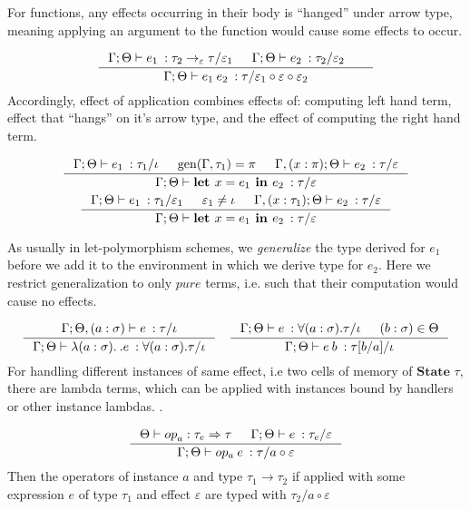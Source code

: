 \documentclass[declaration,shortabstract]{iithesis}
\newcommand{\types}[4][\Gamma;\Theta]{\ensuremath{{{#1} \vdash {#2} \: : {#3}/{#4}}}}
\newcommand{\arrow}[3]{{#1}\rightarrow_{#2}{#3}}
\newcommand{\lam}[1][x]{\ensuremath{\lambda #1.\:}}
\newcommand{\optypes}[5][\Theta]{\ensuremath{{#1}\vdash{#2}_{#3} : {#4} \Rightarrow {#5}}}
\newcommand{\ops}[2]{\optypes{op}{a}{#1}{#2}}
\begin{document}
For functions, any effects occurring in their body is ``hanged'' under arrow type,
meaning applying an argument to the function would cause some effects to occur.

$$
\inference{
    \types{e_1}{\arrow{\tau_2}{\varepsilon}{\tau}}{\varepsilon_1} &
    \types{e_2}{\tau_2}{\varepsilon_2} &
}{
    \types{e_1\:e_2}{\tau}{\varepsilon_1 \circ \varepsilon \circ \varepsilon_2}
}
$$
Accordingly, effect of application combines effects of: computing left hand term,
effect that ``hangs'' on it's arrow type, and the effect of computing the right hand term.

\begin{gather*}
\begin{gathered}
\inference{
    \types{e_1}{\tau_1}{\iota} &
    \operatorname{gen}(\Gamma, \tau_1) = \pi &
    \types[\Gamma,(x:\pi);\Theta]{e_2}{\tau}{\varepsilon}
}{
    \types{\textbf{let } x = e_1 \textbf{ in } e_2}{\tau}{\varepsilon}
}
\\
\inference{
    \types{e_1}{\tau_1}{\varepsilon_1} & 
    \varepsilon_1 \neq \iota & 
    \types[\Gamma,(x:\tau_1);\Theta]{e_2}{\tau}{\varepsilon}
}{
    \types{\textbf{let } x = e_1 \textbf{ in } e_2}{\tau}{\varepsilon}
}
\end{gathered}
\end{gather*}

As usually in let-polymorphism schemes, we \textit{generalize} the type derived for $e_1$ before
we add it to the environment in which we derive type for $e_2$.
Here we restrict generalization to only $pure$ terms,
i.e. such that their computation would cause no effects.

$$
\inference{
    \types[\Gamma; \Theta, (a : \sigma)]{e}{\tau}{\iota}
}{
    \types{\lam[(a : \sigma)]. e}{\forall (a : \sigma) . \tau}{\iota}
}
\quad
\inference{
    \types{e}{\forall (a : \sigma) . \tau}{\iota} & (b:\sigma) \in \Theta
}{
    \types{e\:b}{\tau[b/a]}{\iota}
}
$$
For handling different instances of same effect, i.e two cells of memory of $\textbf{State }\tau$,
there are lambda terms, which can be applied with instances bound by handlers or other instance lambdas.
.

$$
\inference{
    \ops{\tau_e}{\tau} &
    \types{e}{\tau_e}{\varepsilon} 
}{
    \types{op_a \: e}{\tau}{a \circ \varepsilon}
}
$$
Then the operators of instance $a$ and type $\tau_1 \rightarrow \tau_2$ if applied with
some expression $e$ of type $\tau_1$ and effect $\varepsilon$ are typed with $\tau_2 /{ a \circ \varepsilon}$ 
\end{document}
